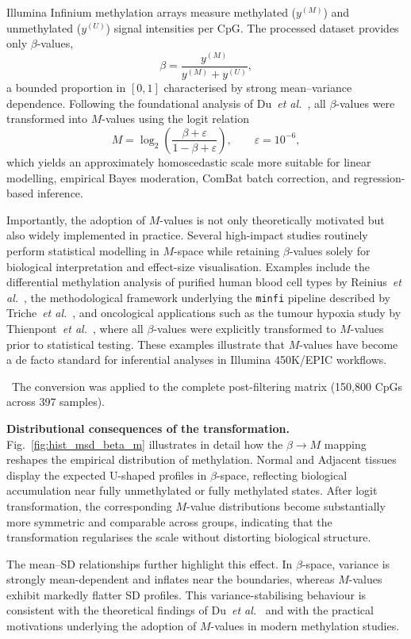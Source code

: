 \documentclass[10pt]{extarticle}
\newcommand{\good}[1]{\textcolor{teal!70!black}{\ding{51}~#1}}
\begin{document}
Illumina Infinium methylation arrays measure methylated ($y^{(M)}$) and unmethylated ($y^{(U)}$) signal intensities per CpG. 
The processed dataset provides only $\beta$-values,
\[
\beta = \frac{y^{(M)}}{y^{(M)} + y^{(U)}},
\]
a bounded proportion in $[0,1]$ characterised by strong mean–variance dependence. 
Following the foundational analysis of Du~\textit{et al.}~\cite{Du2010}, all $\beta$-values were transformed into $M$-values using the logit relation
\[
M = \log_2\!\left(\frac{\beta + \varepsilon}{1 - \beta + \varepsilon}\right),
\qquad \varepsilon = 10^{-6},
\]
which yields an approximately homoscedastic scale more suitable for linear modelling, empirical Bayes moderation, ComBat batch correction, and regression-based inference.

Importantly, the adoption of $M$-values is not only theoretically motivated but also widely implemented in practice.  
Several high-impact studies routinely perform statistical modelling in $M$-space while retaining $\beta$-values solely for biological interpretation and effect-size visualisation.  
Examples include the differential methylation analysis of purified human blood cell types by Reinius~\textit{et al.}~\cite{Reinius2012}, the methodological framework underlying the \texttt{minfi} pipeline described by Triche~\textit{et al.}~\cite{Triche2013}, and oncological applications such as the tumour hypoxia study by Thienpont~\textit{et al.}~\cite{Thienpont2016}, where all $\beta$-values were explicitly transformed to $M$-values prior to statistical testing.  
These examples illustrate that $M$-values have become a de facto standard for inferential analyses in Illumina 450K/EPIC workflows.

\good{The conversion was applied to the complete post-filtering matrix (150{,}800 CpGs across 397 samples).}  

\textbf{Distributional consequences of the transformation.}
Fig.~\ref{fig:hist_msd_beta_m} illustrates in detail how the $\beta \rightarrow M$ mapping reshapes the empirical distribution of methylation.  
Normal and Adjacent tissues display the expected U-shaped profiles in $\beta$-space, reflecting biological accumulation near fully unmethylated or fully methylated states.  
After logit transformation, the corresponding $M$-value distributions become substantially more symmetric and comparable across groups, indicating that the transformation regularises the scale without distorting biological structure.

The mean–SD relationships further highlight this effect.  
In $\beta$-space, variance is strongly mean-dependent and inflates near the boundaries, whereas $M$-values exhibit markedly flatter SD profiles.  
This variance-stabilising behaviour is consistent with the theoretical findings of Du~\textit{et al.}~\cite{Du2010} and with the practical motivations underlying the adoption of $M$-values in modern methylation studies.
\end{document}
